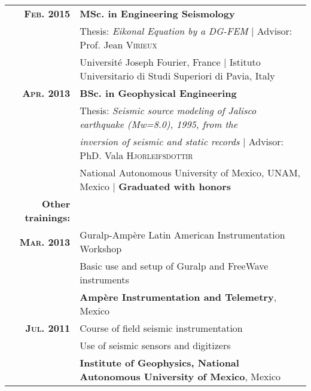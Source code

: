 \documentclass[a4paper,10pt]{article} %
\begin{document}
\begin{tabular}{rl}	
{\bf \textsc{Feb.} 2015} & {\bf MSc. in Engineering Seismology} \\
& Thesis: \emph{Eikonal Equation by a DG-FEM} $|$ \small Advisor: Prof. Jean \textsc{Virieux}\\
& \small{Universit\'e Joseph Fourier, France $|$ Istituto Universitario di Studi Superiori di Pavia, Italy}\\[0.4em]

{\bf \textsc{Apr.} 2013} & {\bf BSc. in Geophysical Engineering} \\
& Thesis: \emph{Seismic source modeling of Jalisco earthquake (Mw=8.0), 1995, from the} \\
& \emph{inversion of seismic and static records} $|$ \small Advisor: PhD. Vala \textsc{Hjorleifsdottir}\\
& \small{National Autonomous University of Mexico, UNAM, Mexico} $|$ \bf{Graduated with honors} \\[0.4em]

{\bf Other trainings:}\\[0.4em]
{\bf \textsc{Mar.} 2013} & Guralp-Amp\`ere Latin American Instrumentation Workshop\\
& Basic use and setup of Guralp and FreeWave instruments\\
& \small\textbf{Amp\`ere Instrumentation and Telemetry}, Mexico\\[0.4em]

{\bf \textsc{Jul.} 2011} & Course of field seismic instrumentation\\
& Use of seismic sensors and digitizers\\
& \small\textbf{Institute of Geophysics, National Autonomous University of Mexico}, Mexico\\
\end{tabular}
\end{document}
